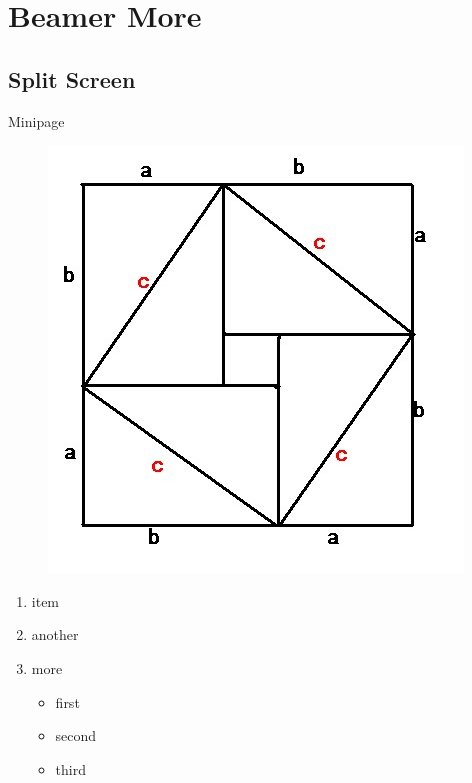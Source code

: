 \section{Beamer More}

\subsection{Split Screen}

\begin{frame}{Minipage}
    \begin{minipage}{0.5\linewidth}
        \begin{figure}[h]
            \includegraphics[width=\textwidth]{imgs/pythagorean.jpg}
        \end{figure}
    \end{minipage}%
    \hfill
    \begin{minipage}{0.4\linewidth}
        \begin{enumerate}
            \item item
            \item another
            \item more
            \begin{itemize}
                \item first
                \item second
                \item third
            \end{itemize}
        \end{enumerate}
    \end{minipage}
    
\end{frame}

